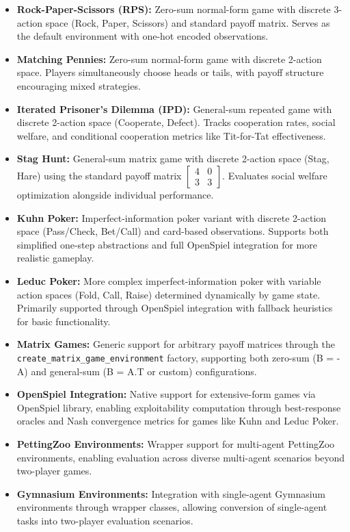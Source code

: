 \documentclass[sigconf,anonymous]{aamas}
\begin{document}
\begin{itemize}
    \item \textbf{Rock-Paper-Scissors (RPS):} Zero-sum normal-form game with discrete 3-action space (Rock, Paper, Scissors) and standard payoff matrix. Serves as the default environment with one-hot encoded observations.

    \item \textbf{Matching Pennies:} Zero-sum normal-form game with discrete 2-action space. Players simultaneously choose heads or tails, with payoff structure encouraging mixed strategies.

    \item \textbf{Iterated Prisoner's Dilemma (IPD):} General-sum repeated game with discrete 2-action space (Cooperate, Defect). Tracks cooperation rates, social welfare, and conditional cooperation metrics like Tit-for-Tat effectiveness.

    \item \textbf{Stag Hunt:} General-sum matrix game with discrete 2-action space (Stag, Hare) using the standard payoff matrix $\begin{bmatrix} 4 & 0 \\ 3 & 3 \end{bmatrix}$. Evaluates social welfare optimization alongside individual performance.

    \item \textbf{Kuhn Poker:} Imperfect-information poker variant with discrete 2-action space (Pass/Check, Bet/Call) and card-based observations. Supports both simplified one-step abstractions and full OpenSpiel integration for more realistic gameplay.

    \item \textbf{Leduc Poker:} More complex imperfect-information poker with variable action spaces (Fold, Call, Raise) determined dynamically by game state. Primarily supported through OpenSpiel integration with fallback heuristics for basic functionality.

    \item \textbf{Matrix Games:} Generic support for arbitrary payoff matrices through the \texttt{create\_matrix\_game\_environment} factory, supporting both zero-sum (B = -A) and general-sum (B = A.T or custom) configurations.

    \item \textbf{OpenSpiel Integration:} Native support for extensive-form games via OpenSpiel library, enabling exploitability computation through best-response oracles and Nash convergence metrics for games like Kuhn and Leduc Poker.

    \item \textbf{PettingZoo Environments:} Wrapper support for multi-agent PettingZoo environments, enabling evaluation across diverse multi-agent scenarios beyond two-player games.

    \item \textbf{Gymnasium Environments:} Integration with single-agent Gymnasium environments through wrapper classes, allowing conversion of single-agent tasks into two-player evaluation scenarios.
\end{itemize}
\end{document}
